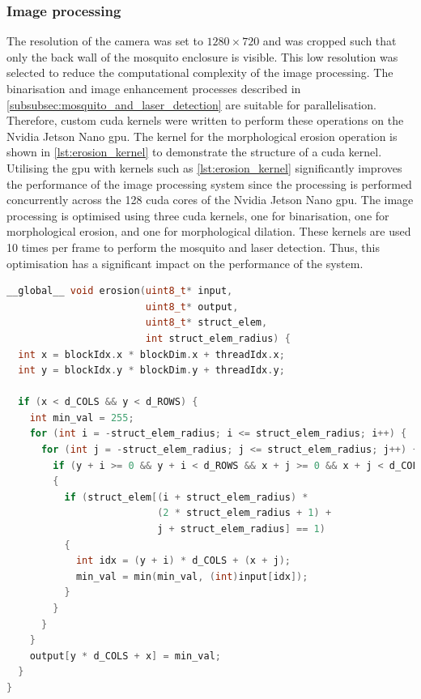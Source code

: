 \subsubsection{Image processing}
The resolution of the camera was set to $1280 \times 720$ and was cropped such that only the back wall of the mosquito enclosure is visible. This low resolution was selected to reduce the computational complexity of the image processing. The binarisation and image enhancement processes described in \autoref{subsubsec:mosquito_and_laser_detection} are suitable for parallelisation. Therefore, custom \gls{cuda} kernels were written to perform these operations on the Nvidia Jetson Nano \gls{gpu}. The kernel for the morphological erosion operation is shown in \autoref{lst:erosion_kernel} to demonstrate the structure of a \gls{cuda} kernel. Utilising the \gls{gpu} with kernels such as \autoref{lst:erosion_kernel} significantly improves the performance of the image processing system since the processing is performed concurrently across the 128 \gls{cuda} cores of the Nvidia Jetson Nano \gls{gpu}. The image processing is optimised using three \gls{cuda} kernels, one for binarisation, one for morphological erosion, and one for morphological dilation. These kernels are used 10 times per frame to perform the mosquito and laser detection. Thus, this optimisation has a significant impact on the performance of the system.

\begin{minipage}{\linewidth}
  \begin{lstlisting}[label={lst:erosion_kernel}, language=C++, caption={Erosion GPU kernel.}]
__global__ void erosion(uint8_t* input,
                        uint8_t* output,
                        uint8_t* struct_elem,
                        int struct_elem_radius) {
  int x = blockIdx.x * blockDim.x + threadIdx.x;
  int y = blockIdx.y * blockDim.y + threadIdx.y;
  
  if (x < d_COLS && y < d_ROWS) {
    int min_val = 255;
    for (int i = -struct_elem_radius; i <= struct_elem_radius; i++) {
      for (int j = -struct_elem_radius; j <= struct_elem_radius; j++) {
        if (y + i >= 0 && y + i < d_ROWS && x + j >= 0 && x + j < d_COLS) 
        {
          if (struct_elem[(i + struct_elem_radius) *
                          (2 * struct_elem_radius + 1) +
                          j + struct_elem_radius] == 1) 
          {
            int idx = (y + i) * d_COLS + (x + j);
            min_val = min(min_val, (int)input[idx]);
          }
        }
      }
    }
    output[y * d_COLS + x] = min_val;
  }
}
\end{lstlisting}
\end{minipage}


